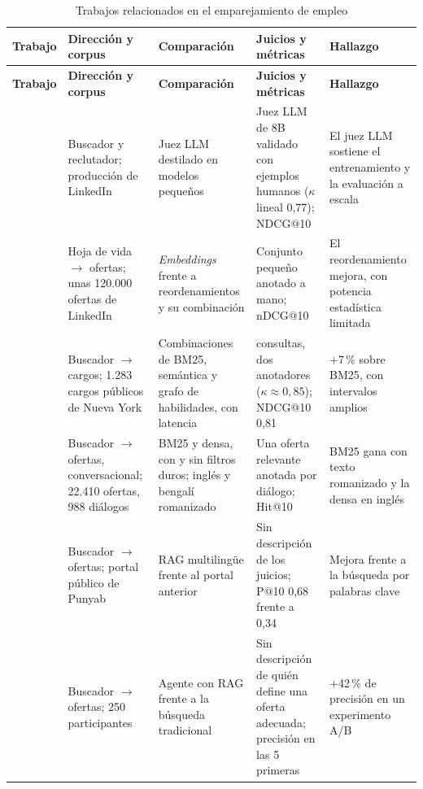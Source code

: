 {\footnotesize
\begin{longtable}{|>{\raggedright\arraybackslash}p{2.2cm}|>{\raggedright\arraybackslash}p{2.6cm}|>{\raggedright\arraybackslash}p{3.1cm}|>{\raggedright\arraybackslash}p{2.8cm}|>{\raggedright\arraybackslash}p{2.6cm}|}
    \caption{Trabajos relacionados en el emparejamiento de empleo}
    \label{tab:ea-trabajos} \\
    \hline
    \textbf{Trabajo} & \textbf{Dirección y corpus} & \textbf{Comparación} & \textbf{Juicios y métricas} & \textbf{Hallazgo} \\
    \hline
    \endfirsthead
    \hline
    \textbf{Trabajo} & \textbf{Dirección y corpus} & \textbf{Comparación} & \textbf{Juicios y métricas} & \textbf{Hallazgo} \\
    \hline
    \endhead
    \citet{Borisyuk2026} & Buscador y reclutador; producción de LinkedIn & Juez LLM destilado en modelos pequeños & Juez LLM de 8B validado con ejemplos humanos ($\kappa$ lineal 0,77); NDCG@10 & El juez LLM sostiene el entrenamiento y la evaluación a escala \\
    \hline
    \citet{Erol2026} & Hoja de vida $\rightarrow$ ofertas; unas 120.000 ofertas de LinkedIn & \textit{Embeddings} frente a reordenamientos y su combinación & Conjunto pequeño anotado a mano; nDCG@10 & El reordenamiento mejora, con potencia estadística limitada \\
    \hline
    \citet{Vyas2026} & Buscador $\rightarrow$ cargos; 1.283 cargos públicos de Nueva York & Combinaciones de BM25, semántica y grafo de habilidades, con latencia & 30 consultas, dos anotadores ($\kappa \approx 0{,}85$); NDCG@10 0,81 & +7\,\% sobre BM25, con intervalos amplios \\
    \hline
    \citet{Hossain2026} & Buscador $\rightarrow$ ofertas, conversacional; 22.410 ofertas, 988 diálogos & BM25 y densa, con y sin filtros duros; inglés y bengalí romanizado & Una oferta relevante anotada por diálogo; Hit@10 & BM25 gana con texto romanizado y la densa en inglés \\
    \hline
    \citet{Srihari2025JobSphere} & Buscador $\rightarrow$ ofertas; portal público de Punyab & RAG multilingüe frente al portal anterior & Sin descripción de los juicios; P@10 0,68 frente a 0,34 & Mejora frente a la búsqueda por palabras clave \\
    \hline
    \citet{Yoruk2025} & Buscador $\rightarrow$ ofertas; 250 participantes & Agente con RAG frente a la búsqueda tradicional & Sin descripción de quién define una oferta adecuada; precisión en las 5 primeras & +42\,\% de precisión en un experimento A/B \\

\end{longtable}}
